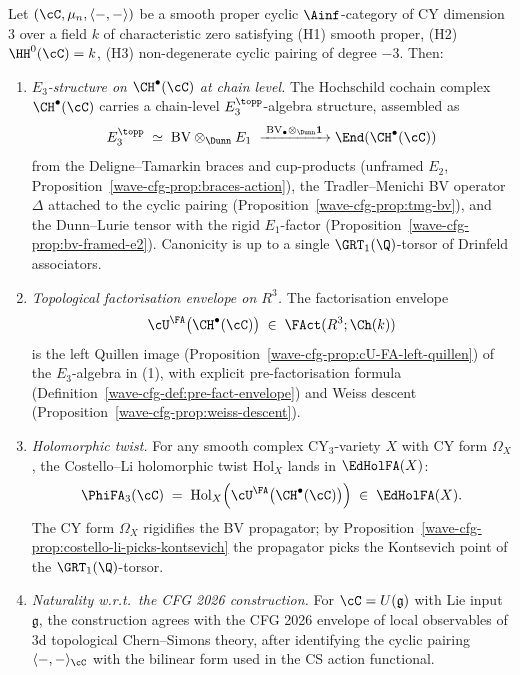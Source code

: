 \begin{theorem}[Chain-level factorisation envelope at $d=3$; stable form]
\label{wave-cfg-thm:phi-fa-envelope-stable-core}
Let $(\cC,\mu_n,\langle-,-\rangle)$ be a smooth proper cyclic
$\Ainf$-category of CY dimension $3$ over a field $k$ of characteristic
zero satisfying \textup{(H1)} smooth proper, \textup{(H2)}
$\HH^0(\cC)=k$, \textup{(H3)} non-degenerate cyclic pairing of degree
$-3$. Then:
\begin{enumerate}
\item \emph{$E_3$-structure on $\CH^\bullet(\cC)$ at chain level.} The
Hochschild cochain complex $\CH^\bullet(\cC)$ carries a chain-level
$E_3^\topp$-algebra structure, assembled as
\[
E_3^\topp\;\simeq\;\mathrm{BV}\otimes_\Dunn E_1
\;\xrightarrow{\;\mathrm{BV}_\bullet\otimes_\Dunn\mathbf 1\;}
\End(\CH^\bullet(\cC))
\]
from the Deligne--Tamarkin braces and cup-products (unframed $E_2$,
Proposition~\ref{wave-cfg-prop:braces-action}), the Tradler--Menichi
BV operator $\Delta$ attached to the cyclic pairing
(Proposition~\ref{wave-cfg-prop:tmg-bv}), and the Dunn--Lurie tensor
with the rigid $E_1$-factor
(Proposition~\ref{wave-cfg-prop:bv-framed-e2}). Canonicity is up to a
single $\GRT_1(\Q)$-torsor of Drinfeld associators.
\item \emph{Topological factorisation envelope on $R^3$.} The
factorisation envelope
\[
\cU^\FA\bigl(\CH^\bullet(\cC)\bigr)\;\in\;\FAct(R^3;\Ch(k))
\]
is the left Quillen image
(Proposition~\ref{wave-cfg-prop:cU-FA-left-quillen}) of the
$E_3$-algebra in (1), with explicit pre-factorisation formula
(Definition~\ref{wave-cfg-def:pre-fact-envelope}) and Weiss descent
(Proposition~\ref{wave-cfg-prop:weiss-descent}).
\item \emph{Holomorphic twist.} For any smooth complex CY$_3$-variety
$X$ with CY form $\Omega_X$, the Costello--Li holomorphic twist
$\mathrm{Hol}_X$ lands in $\EdHolFA(X)$:
\[
\PhiFA_3(\cC)\;=\;\mathrm{Hol}_X\!\left(\cU^\FA\bigl(\CH^\bullet(\cC)\bigr)\right)
\;\in\;\EdHolFA(X).
\]
The CY form $\Omega_X$ rigidifies the BV propagator; by
Proposition~\ref{wave-cfg-prop:costello-li-picks-kontsevich} the
propagator picks the Kontsevich point of the $\GRT_1(\Q)$-torsor.
\item \emph{Naturality w.r.t.\ the CFG 2026 construction.} For
$\cC=U(\mathfrak g)$ with Lie input $\mathfrak g$, the construction
agrees with the CFG 2026 envelope of local observables of $3$d
topological Chern--Simons theory, after identifying the cyclic pairing
$\langle-,-\rangle_\cC$ with the bilinear form used in the CS action
functional.
\end{enumerate}
\end{theorem}

